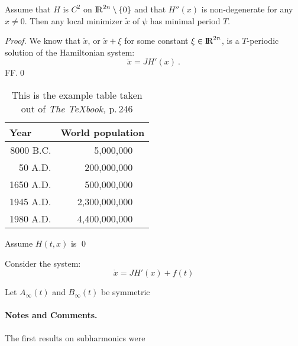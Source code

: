 \documentclass{llncs}
\begin{document}
%

\begin{lemma}
Assume that $H$ is $C^{2}$ on ${\rm I\!R}^{2n} \setminus \{ 0\}$ and that $H'' (x)$ is non-de\-gen\-er\-ate for any $x\ne 0$. Then any local minimizer $\widetilde{x}$ of $\psi$ has minimal period $T$.
\end{lemma}
%
\begin{proof}
We know that $\widetilde{x}$, or
$\widetilde{x} + \xi$ for some constant $\xi \in {\rm I\!R}^{2n}$, is a $T$-periodic solution of the Hamiltonian system:
\begin{equation}
   \dot{x} = JH' (x)\ .
\end{equation}
FF.\qed \end{proof} 

\begin{table}
\caption{This is the example table taken out of {\it The \TeX{}book,} p.\,246} \begin{center} \begin{tabular}{r@{\quad}rl} \hline \multicolumn{1}{l}{\rule{0pt}{12pt}
                    Year}&\multicolumn{2}{l}{World population}\\[2pt] \hline\rule{0pt}{12pt}
8000 B.C.  &     5,000,000& \\
   50 A.D.  &   200,000,000& \\
1650 A.D.  &   500,000,000& \\
1945 A.D.  & 2,300,000,000& \\
1980 A.D.  & 4,400,000,000& \\[2pt]
\hline
\end{tabular}
\end{center}
\end{table}
%
\begin{theorem} \label{ghou:pre}
Assume $H(t,x)$ is
\qed
\end{theorem}
%
\begin{example}  Consider the system:
\begin{equation}
   \dot{x} = JH' (x) + f(t)
\end{equation}
\end{example}
%
\begin{definition}
Let $A_{\infty} (t)$ and $B_{\infty} (t)$ be symmetric
\end{definition}
%

\paragraph{Notes and Comments.}
The first results on subharmonics were
\end{document}
